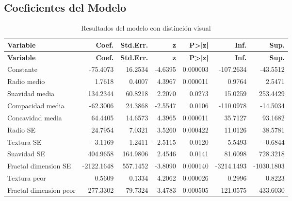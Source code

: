 \documentclass[a4paper, 12pt]{article}
\begin{document}
\subsection{Coeficientes del Modelo}
\begin{longtable}{l !{\vrule width 0.5pt} d d d d d d}
    \caption{Resultados del modelo con distinción visual}\label{tab:modelo2}\\
    \toprule
    \textbf{Variable} & \textbf{Coef.} & \textbf{Std.Err.} & \textbf{z} & \textbf{P>|z|} & \textbf{Inf.} & \textbf{Sup.} \\
    \midrule
    \endfirsthead

    \toprule
    \textbf{Variable} & \textbf{Coef.} & \textbf{Std.Err.} & \textbf{z} & \textbf{P>|z|} & \textbf{Inf.} & \textbf{Sup.} \\
    \midrule
    \endhead

    Constante              & -75.4073       & 16.2534      & -4.6395  & 0.000003  & -107.2634  & -43.5512   \\
    Radio medio            & 1.7618         & 0.4007       & 4.3967   & 0.000011  & 0.9764     & 2.5471     \\
    Suavidad media         & 134.2344       & 60.8218      & 2.2070   & 0.0273    & 15.0259    & 253.4429   \\
    Compacidad media       & -62.3006       & 24.3868      & -2.5547  & 0.0106    & -110.0978  & -14.5034   \\
    Concavidad media       & 64.4405        & 14.6573      & 4.3965   & 0.000011  & 35.7127    & 93.1682    \\
    Radio SE               & 24.7954        & 7.0321       & 3.5260   & 0.000422  & 11.0126    & 38.5781    \\
    Textura SE             & -3.1169        & 1.2411       & -2.5115  & 0.0120    & -5.5493    & -0.6844    \\
    Suavidad SE            & 404.9658       & 164.9806     & 2.4546   & 0.0141    & 81.6098    & 728.3218   \\
    Fractal dimension SE   & -2122.1648     & 557.1452     & -3.8090  & 0.000140  & -3214.1493 & -1030.1803 \\
    Textura peor           & 0.5609         & 0.1334       & 4.2062   & 0.000026  & 0.2996     & 0.8223     \\
    Fractal dimension peor & 277.3302       & 79.7324      & 3.4783   & 0.000505  & 121.0575   & 433.6030   \\
    \bottomrule
\end{longtable}
\end{document}
